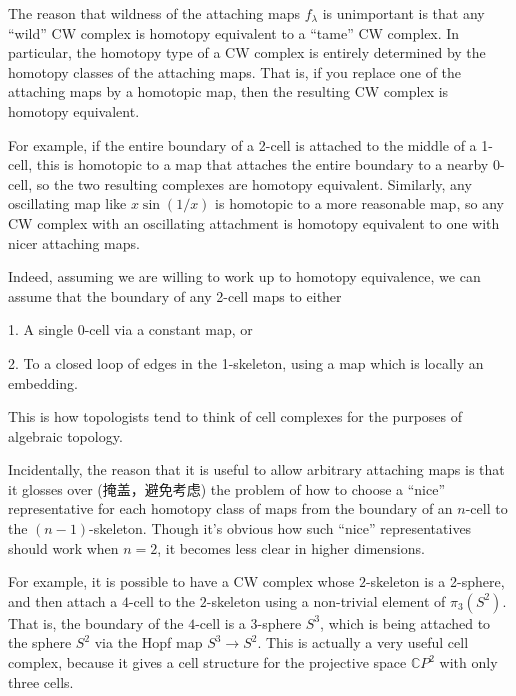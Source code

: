 The reason that wildness of the attaching maps $f_\lambda$ is unimportant is that any ``wild'' CW complex is homotopy equivalent to a ``tame'' CW complex.  In particular, the homotopy type of a CW complex is entirely determined by the homotopy classes of the attaching maps. That is, if you replace one of the attaching maps by a homotopic map, then the resulting CW complex is homotopy equivalent.\par

For example, if the entire boundary of a 2-cell is attached to the middle of a 1-cell, this is homotopic to a map that attaches the entire boundary to a nearby 0-cell, so the two resulting complexes are homotopy equivalent.  Similarly, any oscillating map like $x\sin(1/x)$ is homotopic to a more reasonable map, so any CW complex with an oscillating attachment is homotopy equivalent to one with nicer attaching maps.\par

Indeed, assuming we are willing to work up to homotopy equivalence, we can assume that the boundary of any 2-cell maps to either

1. A single 0-cell via a constant map, or

2. To a closed loop of edges in the 1-skeleton, using a map which is locally an embedding.\par

This is how topologists tend to think of cell complexes for the purposes of algebraic topology.\par

Incidentally, the reason that it is useful to allow arbitrary attaching maps is that it glosses over (掩盖，避免考虑) the problem of how to choose a ``nice'' representative for each homotopy class of maps from the boundary of an $n$-cell to the $(n-1)$-skeleton.  Though it's obvious how such ``nice'' representatives should work when $n=2$, it becomes less clear in higher dimensions.\par

For example, it is possible to have a CW complex whose $2$-skeleton is a 2-sphere, and then attach a $4$-cell to the $2$-skeleton using a non-trivial element of $\pi_3(S^2)$.  That is, the boundary of the $4$-cell is a $3$-sphere $S^3$, which is being attached to the sphere $S^2$ via the Hopf map $S^3 \to S^2$.  This is actually a very useful cell complex, because it gives a cell structure for the projective space $\mathbb{C}P^2$ with only three cells.\par


